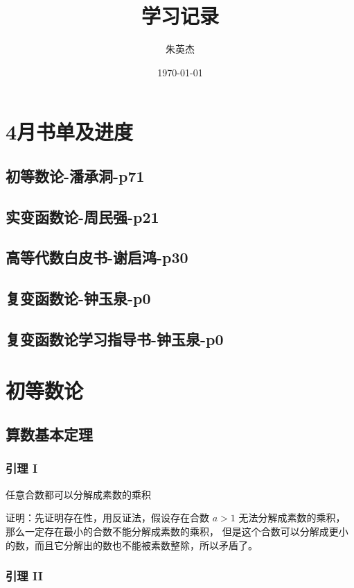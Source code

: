 \documentclass[12pt,a4paper]{ctexart}
\title{学习记录}
\author{朱英杰}
\date{\today}
\begin{document}
\maketitle
\tableofcontents

\section{4月书单及进度}

\subsection{初等数论-潘承洞-p71}

\subsection{实变函数论-周民强-p21}

\subsection{高等代数白皮书-谢启鸿-p30}

\subsection{复变函数论-钟玉泉-p0}
\subsection{复变函数论学习指导书-钟玉泉-p0}


\section{初等数论}

\subsection{算数基本定理}

\subsubsection{引理 I}

任意合数都可以分解成素数的乘积

证明：先证明存在性，用反证法，假设存在合数 $a > 1$ 无法分解成素数的乘积，那么一定存在最小的合数不能分解成素数的乘积，
但是这个合数可以分解成更小的数，而且它分解出的数也不能被素数整除，所以矛盾了。


\subsubsection{引理 II}
\end{document}
